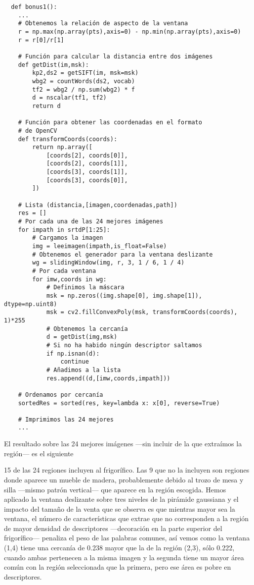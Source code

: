 \documentclass{article}
\newcommand{\img}[2]{
\noindent\makebox[\textwidth][c]{\texttt{[image: imgs/\#1]}}%
}
\begin{document}
\begin{verbatim}
  def bonus1():
    ...
    # Obtenemos la relación de aspecto de la ventana
    r = np.max(np.array(pts),axis=0) - np.min(np.array(pts),axis=0)
    r = r[0]/r[1]
    
    # Función para calcular la distancia entre dos imágenes
    def getDist(im,msk):
        kp2,ds2 = getSIFT(im, msk=msk)
        wbg2 = countWords(ds2, vocab)
        tf2 = wbg2 / np.sum(wbg2) * f
        d = nscalar(tf1, tf2)
        return d
    
    # Función para obtener las coordenadas en el formato
    # de OpenCV
    def transformCoords(coords):
        return np.array([
            [coords[2], coords[0]],
            [coords[2], coords[1]],
            [coords[3], coords[1]],
            [coords[3], coords[0]],
        ])
	
    # Lista (distancia,[imagen,coordenadas,path])
    res = []
    # Por cada una de las 24 mejores imágenes
    for impath in srtdP[1:25]:
        # Cargamos la imagen
        img = leeimagen(impath,is_float=False)
        # Obtenemos el generador para la ventana deslizante
        wg = slidingWindow(img, r, 3, 1 / 6, 1 / 4)
        # Por cada ventana
        for imw,coords in wg:
            # Definimos la máscara
            msk = np.zeros((img.shape[0], img.shape[1]), dtype=np.uint8)
            msk = cv2.fillConvexPoly(msk, transformCoords(coords), 1)*255
            # Obtenemos la cercanía
            d = getDist(img,msk)
            # Si no ha habido ningún descriptor saltamos
            if np.isnan(d):
                continue
            # Añadimos a la lista
            res.append((d,[imw,coords,impath]))
    
    # Ordenamos por cercanía
    sortedRes = sorted(res, key=lambda x: x[0], reverse=True)
    
    # Imprimimos las 24 mejores    
    ...
\end{verbatim}

El resultado sobre las 24 mejores imágenes ---sin incluir de la que extraímos la región--- es el siguiente

\img{b1_2}{0.8}

15 de las 24 regiones incluyen al frigorífico. Las 9 que no la incluyen son regiones donde aparece un mueble de madera, probablemente debido al trozo de mesa y silla ---mismo patrón vertical--- que aparece en la región escogida. Hemos aplicado la ventana deslizante sobre tres niveles de la pirámide gaussiana y el impacto del tamaño de la venta que se observa es que mientras mayor sea la ventana, el número de características que extrae que no corresponden a la región de mayor densidad de descriptores ---decoración en la parte superior del frigorífico--- penaliza el peso de las palabras comunes, así vemos como la ventana (1,4) tiene una cercanía de 0.238 mayor que la de la región (2,3), sólo 0.222, cuando ambas pertenecen a la misma imagen y la segunda tiene un mayor área común con la región seleccionada que la primera, pero ese área es pobre en descriptores. 
\end{document}
